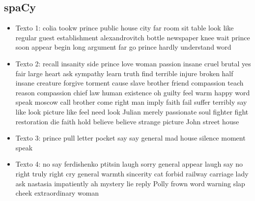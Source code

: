 \documentclass[a4paper,twocolumn]{article}
\begin{document}
    \subsection{spaCy}\label{subsec:spaCy_out}
    \begin{itemize}
        \item Texto 1: colia tookw prince public house city far room sit table look like regular guest establishment alexandrovitch bottle newspaper knee wait prince soon appear begin long argument far go prince hardly understand word
        \item Texto 2: recall insanity side prince love woman passion insane cruel brutal yes fair large heart ask sympathy learn truth find terrible injure broken half insane creature forgive torment cause slave brother friend compassion teach reason compassion chief law human existence oh guilty feel warm happy word speak moscow call brother come right man imply faith fail suffer terribly say like look picture like feel need look Julian merely passionate soul fighter fight restoration die faith hold believe believe strange picture John street house
        \item Texto 3: prince pull letter pocket say say general mad house silence moment speak
        \item Texto 4: no say ferdishenko ptitsin laugh sorry general appear laugh say no right truly right cry general warmth sincerity cat forbid railway carriage lady ask nastasia impatiently ah mystery lie reply Polly frown word warning slap cheek extraordinary woman
    \end{itemize}
\end{document}

